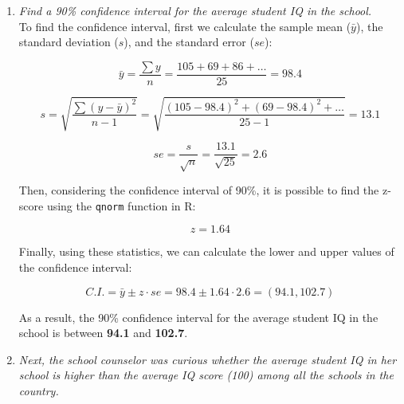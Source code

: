 \documentclass[12pt,letterpaper]{article}
\begin{document}
	\begin{enumerate}
		\item \textit{Find a 90\% confidence interval for the average student IQ in the school.}\\
		
		To find the confidence interval, first we calculate the sample mean ($\bar{y}$), the standard deviation ($s$), and the standard error ($se$):
		
		\vspace{.5cm}
		
				
				$$\bar{y} = \frac{\sum y}{n} = \frac{105+69+86+\dots}{25} = 98.4$$
				
				$$s = \sqrt{\frac{\sum (y - \bar{y})^2}{n-1}} = \sqrt{\frac{(105-98.4)^2 + (69-98.4)^2 + \dots}{25-1}} = 13.1$$
				
				$$se = \frac{s}{\sqrt{n}} = \frac{13.1}{\sqrt{25}} = 2.6$$
		
		\vspace{.5cm}
		
		Then, considering the confidence interval of 90\%, it is possible to find the z-score using the \texttt{qnorm} function in R:
		
		\vspace{.5cm}
		
		
		$$z = 1.64$$
		
		\vspace{.5cm}
		
		Finally, using these statistics, we can calculate the lower and upper values of the confidence interval:
		
		\vspace{.5cm}
		
		
		$$C.I. = \bar{y} \pm z \cdot se = 98.4 \pm 1.64 \cdot 2.6 = (94.1, 102.7)$$

		\vspace{.5cm}
		
		As a result, the 90\% confidence interval for the average student IQ in the school is between \textbf{94.1} and \textbf{102.7}.
		
		\newpage
		
		\item \textit{Next, the school counselor was curious  whether  the average student IQ in her school is higher than the average IQ score (100) among all the schools in the country.}
		

\end{enumerate}
\end{document}
